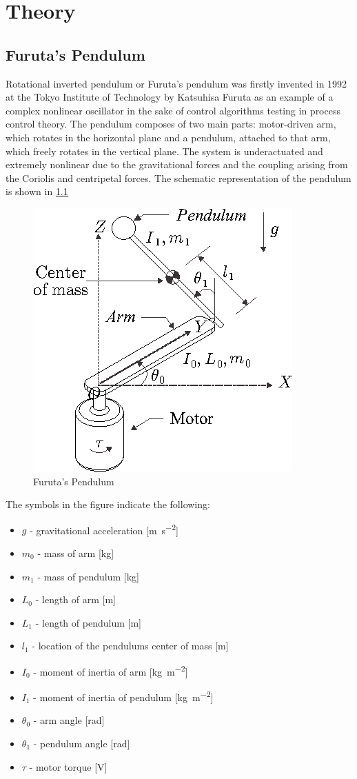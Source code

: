 \chapter{Theory}
\section{Furuta's Pendulum}
Rotational inverted pendulum or Furuta’s pendulum was firstly invented in 1992 at the Tokyo Institute of Technology by Katsuhisa Furuta as an example of a complex nonlinear oscillator in the sake of control algorithms testing in process control theory.
The pendulum composes of two main parts: motor-driven arm, which rotates in the horizontal plane and a pendulum, attached to that arm, which freely rotates in the vertical plane. The system is underactuated and extremely nonlinear due to the gravitational forces and the coupling arising from the Coriolis and centripetal forces. The schematic representation of the pendulum is shown in \ref{furuta}
\begin{figure}[h]
	\centering
	\includegraphics[width=.6\linewidth]{images/furuta}
	\caption{Furuta's Pendulum}
	\label{furuta}
\end{figure}
\newpage
The symbols in the figure indicate the following:
\begin{itemize}
	\item \textbf{$g$} - gravitational acceleration [\si{\metre\per\square\second}]
	\item \textbf{$m_0$} - mass of arm [\si{\kilogram}]
	\item \textbf{$m_1$} - mass of pendulum [\si{\kilogram}]
	\item \textbf{$L_0$} - length of arm [\si{\metre}]
	\item \textbf{$L_1$} - length of pendulum [\si{\metre}]
	\item \textbf{$l_1$} - location of the pendulums center of mass [\si{\metre}]
	\item \textbf{$I_0$} - moment of inertia of arm [\si{\kilogram\per\square\metre}]
	\item \textbf{$I_1$} - moment of inertia of pendulum [\si{\kilogram\per\square\metre}]
	\item \textbf{$\theta_0$} - arm angle [\si{\radian}]
	\item \textbf{$\theta_1$} - pendulum angle [\si{\radian}]
	\item \textbf{$\tau$} - motor torque [\si{\volt}]
\end{itemize}
